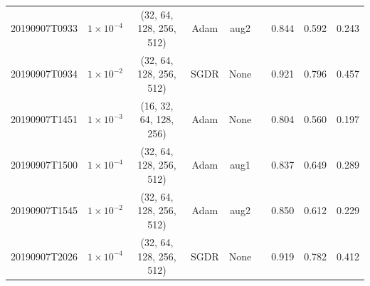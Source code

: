 \begin{table}[!ht]
\begin{adjustbox}{width=\columnwidth, center}
\begin{tabular}{ccccccccc}
			20190907T0933                        & $1\times10^{-4}$                                 & (32, 64, 128, 256, 512)                     & Adam                                & aug2                                                                                      & \xmark                                                                                     & 0.844          & 0.592          & 0.243          \\
			20190907T0934                        & $1\times10^{-2}$                                   & (32, 64, 128, 256, 512)                     & SGDR                                & None                                                                                      & \xmark                                                                                     & 0.921          & 0.796          & 0.457          \\
			20190907T1451                        & $1\times10^{-3}$                                  & (16, 32, 64, 128, 256)                      & Adam                                & None                                                                                      & \cmark                                                                                     & 0.804          & 0.560          & 0.197          \\
			20190907T1500                        & $1\times10^{-4}$                                 & (32, 64, 128, 256, 512)                     & Adam                                & aug1                                                                                      & \xmark                                                                                     & 0.837          & 0.649          & 0.289          \\
			20190907T1545                        & $1\times10^{-2}$                                   & (32, 64, 128, 256, 512)                     & Adam                                & aug2                                                                                      & \xmark                                                                                     & 0.850          & 0.612          & 0.229          \\
			20190907T2026                        & $1\times10^{-4}$                                 & (32, 64, 128, 256, 512)                     & SGDR                                & None                                                                                      & \cmark                                                                                     & 0.919          & 0.782          & 0.412          \\

\end{tabular}
\end{adjustbox}
\end{table}
